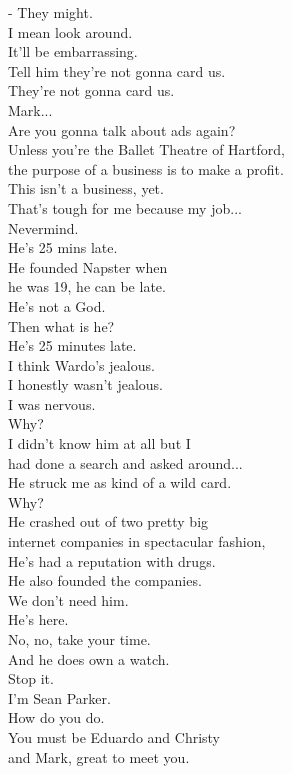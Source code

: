 \documentclass{article}
\begin{document}
\begin{multicols}{3}
- They might.\\
I mean look around.\\
It'll be embarrassing.\\
Tell him they're not gonna card us.\\
They're not gonna card us.\\
Mark...\\
Are you gonna talk about ads again?\\
Unless you're the Ballet Theatre of Hartford,\\
the purpose of a business is to make a profit.\\
This isn't a business, yet.\\
That's tough for me because my job...\\
Nevermind.\\
He's 25 mins late.\\
He founded Napster when\\
he was 19, he can be late.\\
He's not a God.\\
Then what is he?\\
He's 25 minutes late.\\
I think Wardo's jealous.\\
I honestly wasn't jealous.\\
I was nervous.\\
Why?\\
I didn't know him at all but I\\
had done a search and asked around...\\
He struck me as kind of a wild card.\\
Why?\\
He crashed out of two pretty big\\
internet companies in spectacular fashion,\\
He's had a reputation with drugs.\\
He also founded the companies.\\
We don't need him.\\
He's here.\\
No, no, take your time.\\
And he does own a watch.\\
Stop it.\\
I'm Sean Parker.\\
How do you do.\\
You must be Eduardo and Christy\\
and Mark, great to meet you.\\

\end{multicols}
\end{document}
